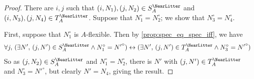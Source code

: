 \begin{proof}
  There are \( i, j \) such that \( (i, N_1), (j, N_2) \in S_A^\NearLitter \) and \( (i, N_3), (j, N_4) \in T_A^\NearLitter \).
  Suppose that \( N_1^\circ = N_2^\circ \); we show that \( N_3^\circ = N_4^\circ \).

  First, suppose that \( N_1^\circ \) is \( A \)-flexible.
  Then by \cref{prop:spec_eq_spec_iff}, we have
  \[ \forall j,\, (\exists N',\, (j, N') \in S_A^\NearLitter \wedge N_1^\circ = {N'}^\circ) \leftrightarrow (\exists N',\, (j, N') \in T_A^\NearLitter \wedge N_3^\circ = {N'}^\circ) \]
  So as \( (j, N_2) \in S_A^\NearLitter \) and \( N_1^\circ = N_2^\circ \), there is \( N' \) with \( (j, N') \in T_A^\NearLitter \) and \( N_3^\circ = {N'}^\circ \), but clearly \( N' = N_4 \), giving the result.


\end{proof}
